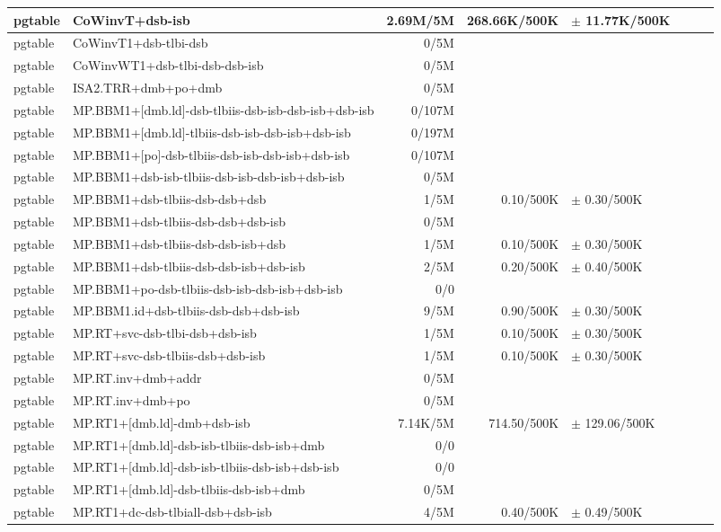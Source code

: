 \begin{tabular}{l l  | r r l | r r l}
\hline
   pgtable&CoWinvT+dsb-isb&2.69M/5M&268.66K/500K&$\pm$ 11.77K/500K&\\
\hline
   pgtable&CoWinvT1+dsb-tlbi-dsb&0/5M&&&\\
\hline
   pgtable&CoWinvWT1+dsb-tlbi-dsb-dsb-isb&0/5M&&&\\
\hline
   pgtable&ISA2.TRR+dmb+po+dmb&0/5M&&&\\
\hline
   pgtable&MP.BBM1+[dmb.ld]-dsb-tlbiis-dsb-isb-dsb-isb+dsb-isb&0/107M&&&\\
\hline
   pgtable&MP.BBM1+[dmb.ld]-tlbiis-dsb-isb-dsb-isb+dsb-isb&0/197M&&&\\
\hline
   pgtable&MP.BBM1+[po]-dsb-tlbiis-dsb-isb-dsb-isb+dsb-isb&0/107M&&&\\
\hline
   pgtable&MP.BBM1+dsb-isb-tlbiis-dsb-isb-dsb-isb+dsb-isb&0/5M&&&\\
\hline
   pgtable&MP.BBM1+dsb-tlbiis-dsb-dsb+dsb&1/5M&0.10/500K&$\pm$ 0.30/500K&\\
\hline
   pgtable&MP.BBM1+dsb-tlbiis-dsb-dsb+dsb-isb&0/5M&&&\\
\hline
   pgtable&MP.BBM1+dsb-tlbiis-dsb-dsb-isb+dsb&1/5M&0.10/500K&$\pm$ 0.30/500K&\\
\hline
   pgtable&MP.BBM1+dsb-tlbiis-dsb-dsb-isb+dsb-isb&2/5M&0.20/500K&$\pm$ 0.40/500K&\\
\hline
   pgtable&MP.BBM1+po-dsb-tlbiis-dsb-isb-dsb-isb+dsb-isb&0/0&&&\\
\hline
   pgtable&MP.BBM1.id+dsb-tlbiis-dsb-dsb+dsb-isb&9/5M&0.90/500K&$\pm$ 0.30/500K&\\
\hline
   pgtable&MP.RT+svc-dsb-tlbi-dsb+dsb-isb&1/5M&0.10/500K&$\pm$ 0.30/500K&\\
\hline
   pgtable&MP.RT+svc-dsb-tlbiis-dsb+dsb-isb&1/5M&0.10/500K&$\pm$ 0.30/500K&\\
\hline
   pgtable&MP.RT.inv+dmb+addr&0/5M&&&\\
\hline
   pgtable&MP.RT.inv+dmb+po&0/5M&&&\\
\hline
   pgtable&MP.RT1+[dmb.ld]-dmb+dsb-isb&7.14K/5M&714.50/500K&$\pm$ 129.06/500K&\\
\hline
   pgtable&MP.RT1+[dmb.ld]-dsb-isb-tlbiis-dsb-isb+dmb&0/0&&&\\
\hline
   pgtable&MP.RT1+[dmb.ld]-dsb-isb-tlbiis-dsb-isb+dsb-isb&0/0&&&\\
\hline
   pgtable&MP.RT1+[dmb.ld]-dsb-tlbiis-dsb-isb+dmb&0/5M&&&\\
\hline
   pgtable&MP.RT1+dc-dsb-tlbiall-dsb+dsb-isb&4/5M&0.40/500K&$\pm$ 0.49/500K&\\
\hline

\end{tabular}
